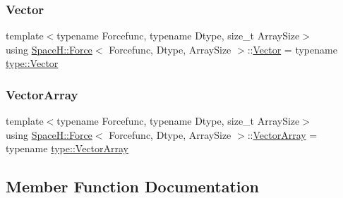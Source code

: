 \mbox{\label{struct_space_h_1_1_force_a7da326c7793f559bb39c73b6d0d01e39}} 
\subsubsection{\texorpdfstring{Vector}{Vector}}
{\footnotesize\ttfamily template$<$typename Forcefunc, typename Dtype, size\+\_\+t Array\+Size$>$ \\
using \mbox{\hyperlink{struct_space_h_1_1_force}{Space\+H\+::\+Force}}$<$ Forcefunc, Dtype, Array\+Size $>$\+::\mbox{\hyperlink{struct_space_h_1_1_force_a7da326c7793f559bb39c73b6d0d01e39}{Vector}} =  typename \mbox{\hyperlink{struct_space_h_1_1_proto_type_a316b81f4660b2b4fab14a8e1f23b6089}{type\+::\+Vector}}}

\mbox{\label{struct_space_h_1_1_force_aa58fd21903006c1d033713d04b4719f3}} 
\subsubsection{\texorpdfstring{Vector\+Array}{VectorArray}}
{\footnotesize\ttfamily template$<$typename Forcefunc, typename Dtype, size\+\_\+t Array\+Size$>$ \\
using \mbox{\hyperlink{struct_space_h_1_1_force}{Space\+H\+::\+Force}}$<$ Forcefunc, Dtype, Array\+Size $>$\+::\mbox{\hyperlink{struct_space_h_1_1_force_aa58fd21903006c1d033713d04b4719f3}{Vector\+Array}} =  typename \mbox{\hyperlink{struct_space_h_1_1_proto_type_a622b8e122b33bb4966a02299fb7b82d6}{type\+::\+Vector\+Array}}}



\subsection{Member Function Documentation}
\mbox{\label{struct_space_h_1_1_force_ac4f8ce97d4513859ad94064ed35ab300}} 
